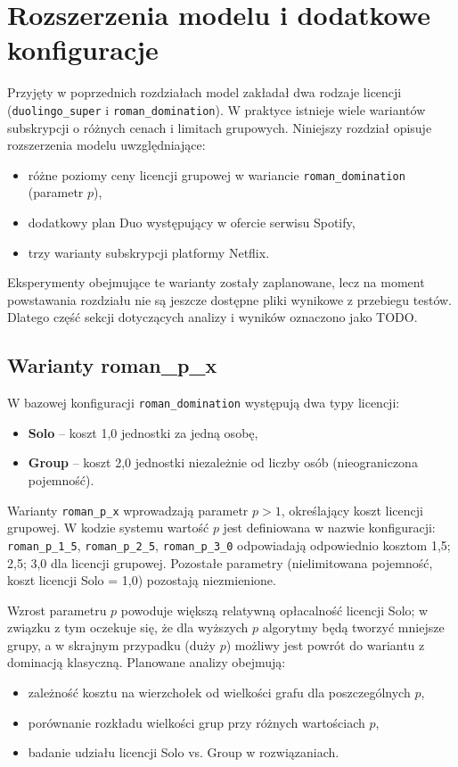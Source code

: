 \chapter{Rozszerzenia modelu i dodatkowe konfiguracje}\label{chap:extensions}

Przyjęty w poprzednich rozdziałach model zakładał dwa rodzaje licencji (\texttt{duolingo\_super} i \texttt{roman\_domination}). W praktyce istnieje wiele wariantów subskrypcji o różnych cenach i limitach grupowych. Niniejszy rozdział opisuje rozszerzenia modelu uwzględniające:
\begin{itemize}
  \item różne poziomy ceny licencji grupowej w wariancie \texttt{roman\_domination} (parametr $p$),
  \item dodatkowy plan Duo występujący w ofercie serwisu Spotify,
  \item trzy warianty subskrypcji platformy Netflix.
\end{itemize}

Eksperymenty obejmujące te warianty zostały zaplanowane, lecz na moment powstawania rozdziału nie są jeszcze dostępne pliki wynikowe z przebiegu testów. Dlatego część sekcji dotyczących analizy i wyników oznaczono jako TODO.

\section{Warianty roman\_p\_x}

W bazowej konfiguracji \texttt{roman\_domination} występują dwa typy licencji:
\begin{itemize}
  \item \textbf{Solo} -- koszt 1,0 jednostki za jedną osobę,
  \item \textbf{Group} -- koszt 2,0 jednostki niezależnie od liczby osób (nieograniczona pojemność).
\end{itemize}

Warianty \texttt{roman\_p\_x} wprowadzają parametr $p > 1$, określający koszt licencji grupowej. W kodzie systemu wartość $p$ jest definiowana w nazwie konfiguracji: \texttt{roman\_p\_1\_5}, \texttt{roman\_p\_2\_5}, \texttt{roman\_p\_3\_0} odpowiadają odpowiednio kosztom 1,5; 2,5; 3,0 dla licencji grupowej. Pozostałe parametry (nielimitowana pojemność, koszt licencji Solo = 1,0) pozostają niezmienione.

Wzrost parametru $p$ powoduje większą relatywną opłacalność licencji Solo; w związku z tym oczekuje się, że dla wyższych $p$ algorytmy będą tworzyć mniejsze grupy, a w skrajnym przypadku (duży $p$) możliwy jest powrót do wariantu z dominacją klasyczną. Planowane analizy obejmują:
\begin{itemize}
  \item zależność kosztu na wierzchołek od wielkości grafu dla poszczególnych $p$,
  \item porównanie rozkładu wielkości grup przy różnych wartościach $p$,
  \item badanie udziału licencji Solo vs. Group w rozwiązaniach.
\end{itemize}

